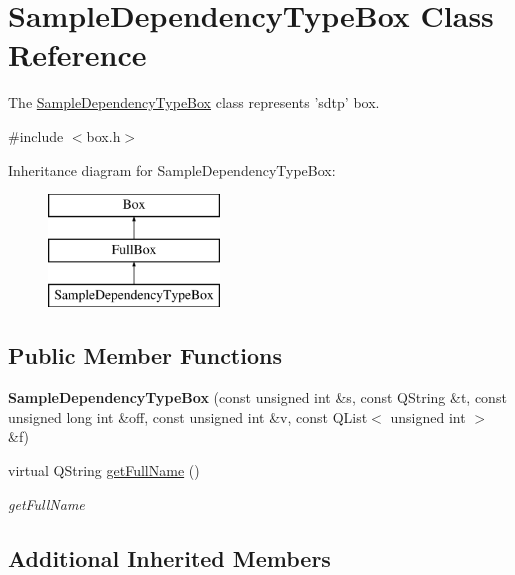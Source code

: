 \hypertarget{class_sample_dependency_type_box}{\section{Sample\-Dependency\-Type\-Box Class Reference}
\label{class_sample_dependency_type_box}
}


The \hyperlink{class_sample_dependency_type_box}{Sample\-Dependency\-Type\-Box} class represents 'sdtp' box.  




{\ttfamily \#include $<$box.\-h$>$}

Inheritance diagram for Sample\-Dependency\-Type\-Box\-:\begin{figure}[H]
\begin{center}
\leavevmode
\includegraphics[height=3.000000cm]{class_sample_dependency_type_box}
\end{center}
\end{figure}
\subsection*{Public Member Functions}
\begin{DoxyCompactItemize}
\item 
\hypertarget{class_sample_dependency_type_box_ae81a6b4fef0e1ae9f43b24fe3e6cffdc}{{\bfseries Sample\-Dependency\-Type\-Box} (const unsigned int \&s, const Q\-String \&t, const unsigned long int \&off, const unsigned int \&v, const Q\-List$<$ unsigned int $>$ \&f)}\label{class_sample_dependency_type_box_ae81a6b4fef0e1ae9f43b24fe3e6cffdc}

\item 
virtual Q\-String \hyperlink{class_sample_dependency_type_box_a2a8819e3085a47d092ddda32be36dbcd}{get\-Full\-Name} ()
\begin{DoxyCompactList}\small\item\em get\-Full\-Name \end{DoxyCompactList}\end{DoxyCompactItemize}
\subsection*{Additional Inherited Members}


